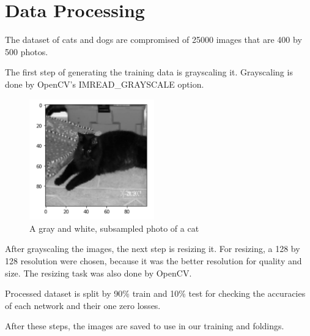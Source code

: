 \section{Data Processing}
The dataset of cats and dogs are compromised of 25000 images that are 400 by 500 photos. \par
The first step of generating the training data is grayscaling it. Grayscaling is done by OpenCV's IMREAD\_GRAYSCALE option. \par
\begin{figure}
    \centering
    \includegraphics[width=0.48\textwidth]{Images/cat_subres.png}
    \caption{A gray and white, subsampled photo of a cat}
    \label{fig:cat_subres}
\end{figure}
After grayscaling the images, the next step is resizing it. For resizing, a 128 by 128 resolution were chosen, because it was the better resolution for quality and size. The resizing task was also done by OpenCV. \par
Processed dataset is split by 90\% train and 10\% test for checking the accuracies of each network and their one zero losses. \par
After these steps, the images are saved to use in our training and foldings. 